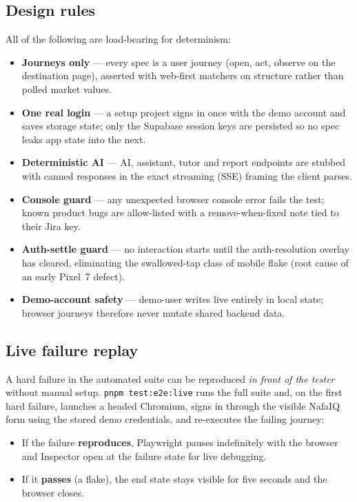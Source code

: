 \documentclass[11pt,a4paper]{article}
\begin{document}
\subsection{Design rules}
All of the following are load-bearing for determinism:
\begin{itemize}
  \item \textbf{Journeys only} --- every spec is a user journey (open, act,
        observe on the destination page), asserted with web-first matchers on
        structure rather than polled market values.
  \item \textbf{One real login} --- a setup project signs in once with the demo
        account and saves storage state; only the Supabase session keys are
        persisted so no spec leaks app state into the next.
  \item \textbf{Deterministic AI} --- AI, assistant, tutor and report endpoints
        are stubbed with canned responses in the exact streaming (SSE) framing
        the client parses.
  \item \textbf{Console guard} --- any unexpected browser console error fails the
        test; known product bugs are allow-listed with a
        remove-when-fixed note tied to their Jira key.
  \item \textbf{Auth-settle guard} --- no interaction starts until the
        auth-resolution overlay has cleared, eliminating the swallowed-tap class
        of mobile flake (root cause of an early Pixel~7 defect).
  \item \textbf{Demo-account safety} --- demo-user writes live entirely in local
        state; browser journeys therefore never mutate shared backend data.
\end{itemize}

\subsection{Live failure replay}
A hard failure in the automated suite can be reproduced \emph{in front of the
tester} without manual setup. \texttt{pnpm test:e2e:live} runs the full suite and,
on the first hard failure, launches a headed Chromium, signs in through the
visible NafaIQ form using the stored demo credentials, and re-executes the
failing journey:

\begin{itemize}
  \item If the failure \textbf{reproduces}, Playwright pauses indefinitely with the
        browser and Inspector open at the failure state for live debugging.
  \item If it \textbf{passes} (a flake), the end state stays visible for five
        seconds and the browser closes.
\end{itemize}
\end{document}
